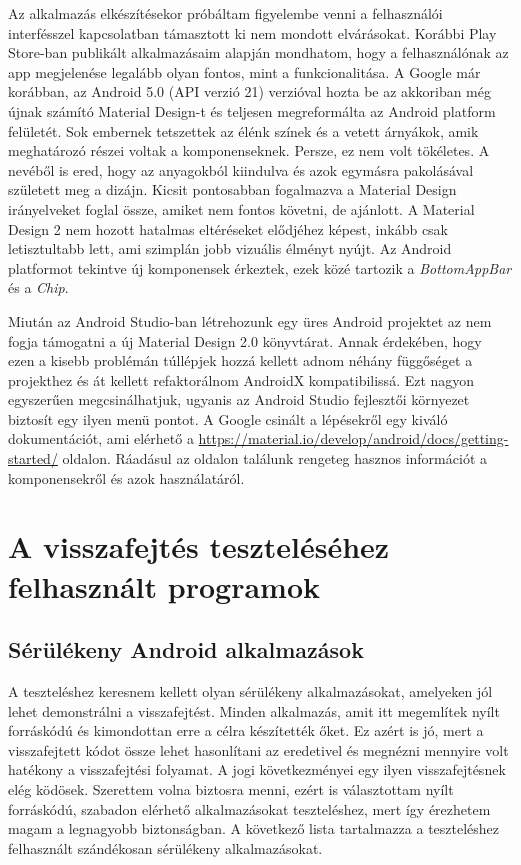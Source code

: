 \documentclass{thesis-ekf}
\theoremstyle{definition}
\theoremstyle{remark}
\begin{document}
Az alkalmazás elkészítésekor próbáltam figyelembe venni a felhasználói interfésszel kapcsolatban támasztott ki nem mondott elvárásokat.
Korábbi Play Store-ban publikált alkalmazásaim alapján mondhatom, hogy a felhasználónak az app megjelenése legalább olyan fontos, mint a funkcionalitása.
A Google már korábban, az Android 5.0 (API verzió 21) verzióval hozta be az akkoriban még újnak számító Material Design-t és teljesen megreformálta az Android platform felületét.
Sok embernek tetszettek az élénk színek és a vetett árnyákok, amik meghatározó részei voltak a komponenseknek. Persze, ez nem volt tökéletes.
A nevéből is ered, hogy az anyagokból kiindulva és azok egymásra pakolásával született meg a dizájn. 
Kicsit pontosabban fogalmazva a Material Design irányelveket foglal össze, amiket nem fontos követni, de ajánlott. 
A Material Design 2 nem hozott hatalmas eltéréseket elődjéhez képest, inkább csak letisztultabb lett, ami szimplán jobb vizuális élményt nyújt.
Az Android platformot tekintve új komponensek érkeztek, ezek közé tartozik a \emph{BottomAppBar} és a \emph{Chip}.


Miután az Android Studio-ban létrehozunk egy üres Android projektet az nem fogja támogatni a új Material Design 2.0 könyvtárat.
Annak érdekében, hogy ezen a kisebb problémán túllépjek hozzá kellett adnom néhány függőséget a projekthez és át kellett refaktorálnom AndroidX kompatibilissá.
Ezt nagyon egyszerűen megcsinálhatjuk, ugyanis az Android Studio fejlesztői környezet biztosít egy ilyen menü pontot.
A Google csinált a lépésekről egy kiváló dokumentációt, ami elérhető a \mbox{\url{https://material.io/develop/android/docs/getting-started/}} oldalon.
Ráadásul az oldalon találunk rengeteg hasznos információt a komponensekről és azok használatáról.

\chapter{A visszafejtés teszteléséhez felhasznált programok}\label{teszteles}

\section{Sérülékeny Android alkalmazások}

A teszteléshez keresnem kellett olyan sérülékeny alkalmazásokat, amelyeken jól lehet demonstrálni a visszafejtést.
Minden alkalmazás, amit itt megemlítek nyílt forráskódú és kimondottan erre a célra készítették őket.
Ez azért is jó, mert a visszafejtett kódot össze lehet hasonlítani az eredetivel és megnézni mennyire volt hatékony a visszafejtési folyamat.
A jogi következményei egy ilyen visszafejtésnek elég ködösek.
Szerettem volna biztosra menni, ezért is választottam nyílt forráskódú, szabadon elérhető alkalmazásokat teszteléshez, mert így érezhetem magam a legnagyobb biztonságban.
A következő lista tartalmazza a teszteléshez felhasznált szándékosan sérülékeny alkalmazásokat.
\end{document}
